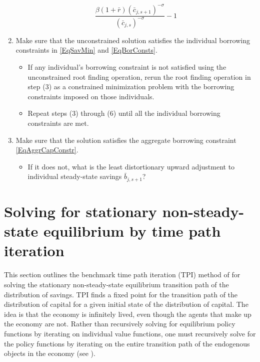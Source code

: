 \documentclass[letterpaper,12pt]{article}
\theoremstyle{definition}
\begin{document}
\begin{enumerate}
\begin{equation}
        \frac{\beta \left(1+\bar{r}\right)\left(\bar{c}_{j,s+1}\right)^{-\sigma}}{\left(\bar{c}_{j,s}\right)^{-\sigma}} - 1
      \end{equation}
    \item Make sure that the unconstrained solution satisfies the individual borrowing constraints in \eqref{EqSavMin} and \eqref{EqBorConsts}.
      \begin{itemize}
        \item If any individual's borrowing constraint is not satisfied using the unconstrained root finding operation, rerun the root finding operation in step (3) as a constrained minimization problem with the borrowing constraints imposed on those individuals.
        \item Repeat steps (3) through (6) until all the individual borrowing constraints are met.
      \end{itemize}
    \item Make sure that the solution satisfies the aggregate borrowing constraint \eqref{EqAggrCapConstr}.
      \begin{itemize}
        \item If it does not, what is the least distortionary upward adjustment to individual steady-state savings $\bar{b}_{j,s+1}$?
      \end{itemize}
  \end{enumerate}


\newpage
\section{Solving for stationary non-steady-state equilibrium by time path iteration}\label{AppNonSSsolve}

  \setcounter{equation}{0}

  This section outlines the benchmark time path iteration (TPI) method of \citet{AuerbachKotlikoff:1987} for solving the stationary non-steady-state equilibrium transition path of the distribution of savings. TPI finds a fixed point for the transition path of the distribution of capital for a given initial state of the distribution of capital. The idea is that the economy is infinitely lived, even though the agents that make up the economy are not. Rather than recursively solving for equilibrium policy functions by iterating on individual value functions, one must recursively solve for the policy functions by iterating on the entire transition path of the endogenous objects in the economy (see \citet[ch. 17]{StokeyLucas:1989}).
\end{document}
